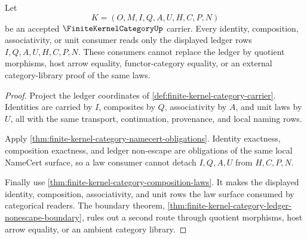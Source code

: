 \begin{theorem}
\label{thm:finite-kernel-category-composition-ledger-nonescape}
Let
$$
K=(O,M,I,Q,A,U,H,C,P,N)
$$
be an accepted $\FiniteKernelCategoryUp$ carrier. Every identity, composition,
associativity, or unit consumer reads only the displayed ledger rows
$I,Q,A,U,H,C,P,N$. These consumers cannot replace the ledger by quotient
morphisms, host arrow equality, functor-category equality, or an external
category-library proof of the same laws.
\end{theorem}
\begin{proof}
Project the ledger coordinates of \autoref{def:finite-kernel-category-carrier}.
Identities are carried by $I$, composites by $Q$, associativity by $A$, and
unit laws by $U$, all with the same transport, continuation, provenance, and
local naming rows.

Apply \autoref{thm:finite-kernel-category-namecert-obligations}. Identity
exactness, composition exactness, and ledger non-escape are obligations of the
same local NameCert surface, so a law consumer cannot detach $I,Q,A,U$ from
$H,C,P,N$.

Finally use \autoref{thm:finite-kernel-category-composition-laws}. It makes
the displayed identity, composition, associativity, and unit rows the law
surface consumed by categorical readers. The boundary theorem,
\autoref{thm:finite-kernel-category-ledger-nonescape-boundary}, rules out a
second route through quotient morphisms, host arrow equality, or an ambient
category library.
\end{proof}

